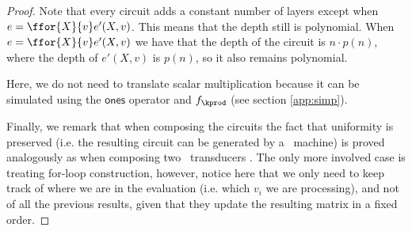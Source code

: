 \begin{proof}
Note that every circuit adds a constant number of layers except when $e=\ffor{X}{v}e'(X, v)$. 
This means that the depth still is polynomial. When $e=\ffor{X}{v}e'(X, v)$
we have that the depth of the circuit is $n\cdot p(n)$, where the depth of $e'(X, v)$ is $p(n)$, 
so it also remains polynomial.

Here, we do not need to translate scalar multiplication
because it can be simulated using the $\mathsf{ones}$ operator and $f_{\kprod}$ (see section \ref{app:simp}).

Finally, we remark that when composing the circuits the fact that uniformity is preserved (i.e. the resulting circuit can be generated by a \logspace\ machine) is proved analogously as when composing two \logspace\ transducers \cite{aroraB2009}. The only more involved case is treating for-loop construction, however, notice here that we only need to keep track of where we are in the evaluation (i.e. which $v_i$ we are processing), and not of all the previous results, given that they update the resulting matrix in a fixed order.

\end{proof}





